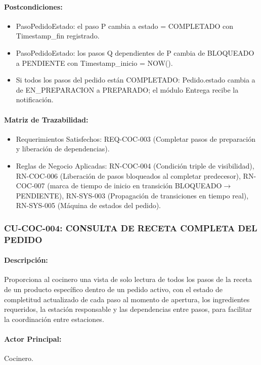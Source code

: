 \paragraph{Postcondiciones:}
\begin{itemize}
    \item PasoPedidoEstado: el paso P cambia a estado = COMPLETADO con Timestamp\_fin registrado.
    \item PasoPedidoEstado: los pasos Q dependientes de P cambia de BLOQUEADO a PENDIENTE con Timestamp\_inicio = NOW().
    \item Si todos los pasos del pedido están COMPLETADO: Pedido.estado cambia a de EN\_PREPARACION a PREPARADO; el módulo Entrega recibe la notificación.
\end{itemize}

\paragraph{Matriz de Trazabilidad:}
\begin{itemize}
    \item Requerimientos Satisfechos: REQ-COC-003 (Completar pasos de preparación y liberación de dependencias).
    \item Reglas de Negocio Aplicadas: RN-COC-004 (Condición triple de visibilidad), RN-COC-006 (Liberación de pasos bloqueados al completar predecesor), RN-COC-007 (marca de tiempo de inicio en transición BLOQUEADO$\rightarrow$PENDIENTE), RN-SYS-003 (Propagación de transiciones en tiempo real), RN-SYS-005 (Máquina de estados del pedido).
\end{itemize}

\subsubsection{CU-COC-004: CONSULTA DE RECETA COMPLETA DEL PEDIDO}
\paragraph{Descripción:} Proporciona al cocinero una vista de solo lectura de todos los pasos de la receta de un producto específico dentro de un pedido activo, con el estado de completitud actualizado de cada paso al momento de apertura, los ingredientes requeridos, la estación responsable y las dependencias entre pasos, para facilitar la coordinación entre estaciones.

\paragraph{Actor Principal:} Cocinero.

